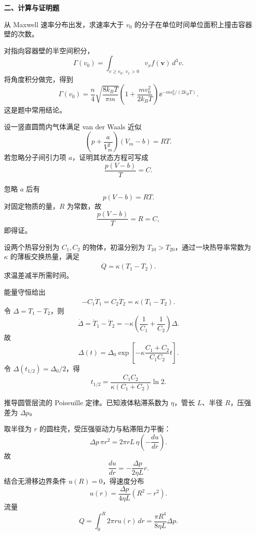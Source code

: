 \textbf{二、计算与证明题}
\begin{question}
从 Maxwell 速率分布出发，求速率大于 $v_0$ 的分子在单位时间单位面积上撞击容器壁的次数。
\begin{solution}

对指向容器壁的半空间积分，
\[
\Gamma(v_0)=\int_{v\ge v_0,\ v_x>0}v_x f(\mathbf v)\,d^3v.
\]
将角度积分做完，得到
\[
\Gamma(v_0)=\frac{n}{4}\sqrt{\frac{8k_BT}{\pi m}}
\left(1+\frac{mv_0^2}{2k_BT}\right)\ee^{-mv_0^2/(2k_BT)}.
\]
这是题中常用结论。
\end{solution}
\end{question}

\begin{question}
设一竖直圆筒内气体满足 van der Waals 近似
\[
\left(p+\frac{a}{V_m^2}\right)(V_m-b)=RT.
\]
若忽略分子间引力项 $a$，证明其状态方程可写成
\[
\frac{p(V-b)}{T}=C.
\]

\begin{solution}

忽略 $a$ 后有
\[
p(V-b)=RT.
\]
对固定物质的量，$R$ 为常数，故
\[
\frac{p(V-b)}{T}=R=C,
\]
即得证。
\end{solution}
\end{question}

\begin{question}
设两个热容分别为 $C_1,C_2$ 的物体，初温分别为 $T_{10}>T_{20}$，通过一块热导率常数为 $\kappa$ 的薄板交换热量，满足
\[
\dot Q=\kappa(T_1-T_2).
\]
求温差减半所需时间。
\begin{solution}

能量守恒给出
\[
-C_1\dot T_1=C_2\dot T_2=\kappa(T_1-T_2).
\]
令 $\Delta=T_1-T_2$，则
\[
\dot\Delta=\dot T_1-\dot T_2=-\kappa\left(\frac1{C_1}+\frac1{C_2}\right)\Delta.
\]
故
\[
\Delta(t)=\Delta_0\exp\!\left[-\kappa\frac{C_1+C_2}{C_1C_2}t\right].
\]
令 $\Delta(t_{1/2})=\Delta_0/2$，得
\[
t_{1/2}=\frac{C_1C_2}{\kappa(C_1+C_2)}\ln2.
\]
\end{solution}
\end{question}

\begin{question}
推导圆管层流的 Poiseuille 定律。已知液体粘滞系数为 $\eta$，管长 $L$、半径 $R$，压强差为 $\Delta p$。
\begin{solution}

取半径为 $r$ 的圆柱壳，受压强驱动力与粘滞阻力平衡：
\[
\Delta p\,\pi r^2=2\pi rL\,\eta\left(-\frac{du}{dr}\right).
\]
故
\[
\frac{du}{dr}=-\frac{\Delta p}{2\eta L}r.
\]
结合无滑移边界条件 $u(R)=0$，得速度分布
\[
 u(r)=\frac{\Delta p}{4\eta L}(R^2-r^2).
\]
流量
\[
Q=\int_0^R2\pi r u(r)\,dr=\frac{\pi R^4}{8\eta L}\Delta p.
\]

\end{solution}
\end{question}

